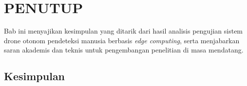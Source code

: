 \chapter{PENUTUP}
\label{sec:chap5_tutup}
\vspace{1ex}

Bab ini menyajikan kesimpulan yang ditarik dari hasil analisis pengujian sistem drone otonom pendeteksi manusia berbasis \textit{edge computing}, serta menjabarkan saran akademis dan teknis untuk pengembangan penelitian di masa mendatang.

\section{Kesimpulan}
\label{sec:sec5_kesimpulan}
\vspace{1ex}

